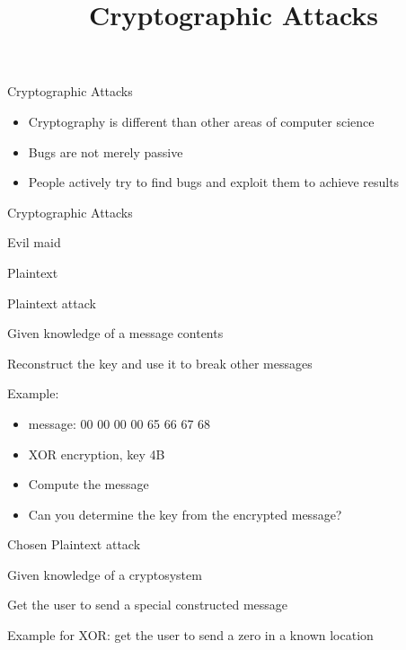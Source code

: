 

\title[]{Cryptographic Attacks}

\begin{frame}
\titlepage
\end{frame}

\begin{withoutheadline}

\begin{frame}{Cryptographic Attacks}
\begin{itemize}
    \item Cryptography is different than other areas of computer science
    \item Bugs are not merely passive
    \item People actively try to find bugs and exploit them to achieve results
\end{itemize}
\end{frame}

\begin{frame}{Cryptographic Attacks}
    \item Evil maid
    \item Plaintext
    \item 
    \item
    \item
    \item
    \item
\end{frame}

\begin{frame}{Plaintext attack}
    \item Given knowledge of a message contents
    \item Reconstruct the key and use it to break other messages
    \item Example:
    \begin{itemize}
        \item message: 00 00 00 00 65 66 67 68
        \item XOR encryption, key 4B
        \item Compute the message
        \item Can you determine the key from the encrypted message?
    \end{itemize}
\end{frame}

\begin{frame}{Chosen Plaintext attack}
    \item Given knowledge of a cryptosystem
    \item Get the user to send a special constructed message
    \item Example for XOR: get the user to send a zero in a known location
\end{frame}


\end{withoutheadline}
